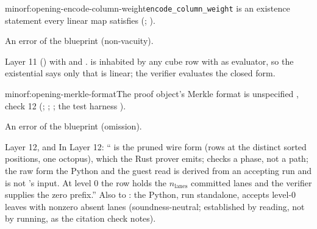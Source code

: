 \begin{finding}{minor}{f:opening-encode-column-weight}{\texttt{encode\_column\_weight} is an existence statement every linear map satisfies}
  (; ).

 An error of the blueprint (non-vacuity).

\begin{change}{Layer 11 ()}
\asis {}
\asproposed {} with
 and
.
\reason {} is inhabited by any cube row with  as evaluator, so the
existential says only that  is linear; the verifier evaluates the closed form.
\end{change}
\end{finding}

\begin{finding}{minor}{f:opening-merkle-format}{The proof object's Merkle format is unspecified}
 , check 12
(; ; ;
the test harness ).

 An error of the blueprint (omission).

\begin{change}{Layer 12, and }
\asproposed In Layer 12: `` is the pruned wire form 
(rows at the distinct sorted positions, one octopus), which the Rust prover emits;
 checks a phase, not a path; the raw form the Python and the guest read is derived
from an accepting run and is not 's input. At level 0 the row holds the
$n_{\mathrm{lanes}}$ committed lanes and the verifier supplies the zero prefix.'' Also to
: the Python, run standalone, accepts level-0 leaves with nonzero absent
lanes (soundness-neutral; established by reading, not by running, as the citation check notes).
\end{change}
\end{finding}


